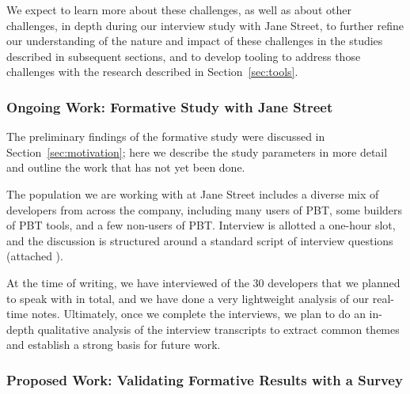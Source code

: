 We expect to learn more about these challenges, as well as about other challenges,
in depth during our interview study with Jane Street, to further refine our
understanding of the nature and impact of these challenges in the studies
described in subsequent sections, and to develop tooling to address
those challenges with the research described in Section~\ref{sec:tools}.

\subsubsection{Ongoing Work: Formative Study with Jane Street}
The preliminary findings of the formative study were discussed in
Section~\ref{sec:motivation}; here we describe the study parameters in more
detail and outline the work that has not yet been done.

The population we are working with at Jane Street includes a diverse mix of
developers from across the company, including many users of PBT, some builders
of PBT tools, and a few non-users of PBT. Interview is allotted a one-hour slot,
and the discussion is structured around a standard script of interview questions
(attached ).

At the time of writing, we have interviewed  of the 30 developers that we
planned to speak with in total, and we have done a very lightweight analysis of
our real-time notes. Ultimately, once we complete the interviews, we plan to do
an in-depth qualitative analysis of the interview transcripts to extract common
themes and establish a strong basis for future work.


\subsubsection{Proposed Work: Validating Formative Results with a Survey}

